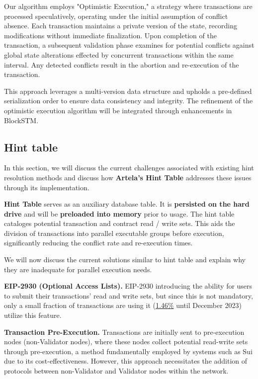 Our algorithm employs "Optimistic Execution," a strategy where transactions are processed speculatively, operating under the initial assumption of conflict absence. Each transaction maintains a private version of the state, recording modifications without immediate finalization. Upon completion of the transaction, a subsequent validation phase examines for potential conflicts against global state alterations effected by concurrent transactions within the same interval. Any detected conflicts result in the abortion and re-execution of the transaction. 

This approach leverages a multi-version data structure and upholds a pre-defined serialization order to ensure data consistency and integrity. The refinement of the optimistic execution algorithm will be integrated through enhancements in BlockSTM.

\subsection{Hint table}

In this section, we will discuss the current challenges associated with existing hint resolution methods and discuss how \textbf{Artela's Hint Table} addresses these issues through its implementation.

\textbf{Hint Table} serves as an auxiliary database table. It is \textbf{persisted on the hard drive} and will be \textbf{preloaded into memory} prior to usage. The hint table cataloges potential transaction and contract read / write sets. This aids the division of transactions into parallel executable groups before execution, significantly reducing the conflict rate and re-execution times.

We will now discuss the current solutions similar to hint table and explain why they are inadequate for parallel execution needs.

\textbf{EIP-2930 (Optional Access Lists).} EIP-2930 introducing the ability for users to submit their transactions' read and write sets, but since this is not mandatory, only a small fraction of transactions are using it (\href{https://arxiv.org/html/2312.06574v1#:~:text=Analyzing%20a%20full%20month%20of,%24%205%20Mio)%20per%20year.}{1.46\%} until December 2023) utilize this feature.

\textbf{Transaction Pre-Execution.} Transactions are initially sent to pre-execution nodes (non-Validator nodes), where these nodes collect potential read-write sets through pre-execution, a method fundamentally employed by systems such as Sui due to its cost-effectiveness. However, this approach necessitates the addition of protocols between non-Validator and Validator nodes within the network.

